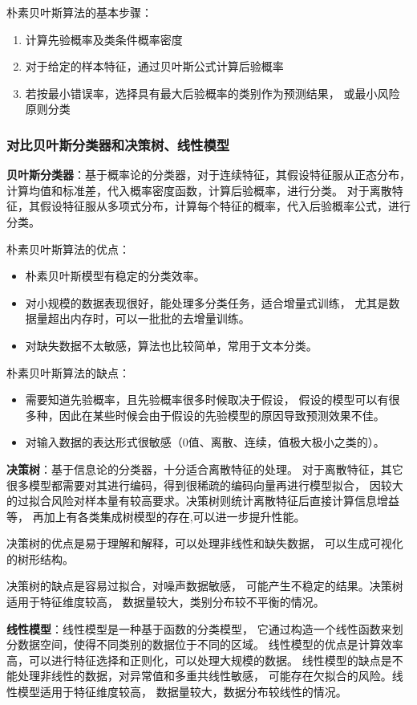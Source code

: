 \documentclass[lang=cn,a4paper]{shu-lab-report}
\begin{document}
朴素贝叶斯算法的基本步骤：
\begin{enumerate}
    \item 计算先验概率及类条件概率密度
    \item 对于给定的样本特征，通过贝叶斯公式计算后验概率
    \item 若按最小错误率，选择具有最大后验概率的类别作为预测结果，
    或最小风险原则分类
\end{enumerate}

\subsubsection{对比贝叶斯分类器和决策树、线性模型}
\textbf{贝叶斯分类器}：基于概率论的分类器，对于连续特征，其假设特征服从正态分布，
计算均值和标准差，代入概率密度函数，计算后验概率，进行分类。
对于离散特征，其假设特征服从多项式分布，计算每个特征的概率，代入后验概率公式，进行分类。

朴素贝叶斯算法的优点：
\begin{itemize}
    \item 朴素贝叶斯模型有稳定的分类效率。
    \item 对小规模的数据表现很好，能处理多分类任务，适合增量式训练，
    尤其是数据量超出内存时，可以一批批的去增量训练。
    \item 对缺失数据不太敏感，算法也比较简单，常用于文本分类。
\end{itemize}

朴素贝叶斯算法的缺点：
\begin{itemize}
    \item 需要知道先验概率，且先验概率很多时候取决于假设，
    假设的模型可以有很多种，因此在某些时候会由于假设的先验模型的原因导致预测效果不佳。
    \item 对输入数据的表达形式很敏感（0值、离散、连续，值极大极小之类的）。
\end{itemize}

\textbf{决策树}：基于信息论的分类器，十分适合离散特征的处理。
对于离散特征，其它很多模型都需要对其进行编码，得到很稀疏的编码向量再进行模型拟合，
因较大的过拟合风险对样本量有较高要求。决策树则统计离散特征后直接计算信息增益等，
再加上有各类集成树模型的存在,可以进一步提升性能。

决策树的优点是易于理解和解释，可以处理非线性和缺失数据，
可以生成可视化的树形结构。

决策树的缺点是容易过拟合，对噪声数据敏感，
可能产生不稳定的结果。决策树适用于特征维度较高，
数据量较大，类别分布较不平衡的情况。

\textbf{线性模型}：线性模型是一种基于函数的分类模型，
它通过构造一个线性函数来划分数据空间，使得不同类别的数据位于不同的区域。
线性模型的优点是计算效率高，可以进行特征选择和正则化，可以处理大规模的数据。
线性模型的缺点是不能处理非线性的数据，对异常值和多重共线性敏感，
可能存在欠拟合的风险。线性模型适用于特征维度较高，
数据量较大，数据分布较线性的情况。
\end{document}
